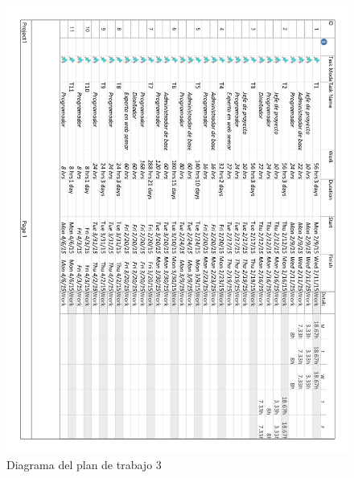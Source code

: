\begin{figure}[!htp]
	\centering
	\includegraphics[page=3, scale=.8]{fig/work_plan_diagram}
	\caption{Diagrama del plan de trabajo 3}
\end{figure}

